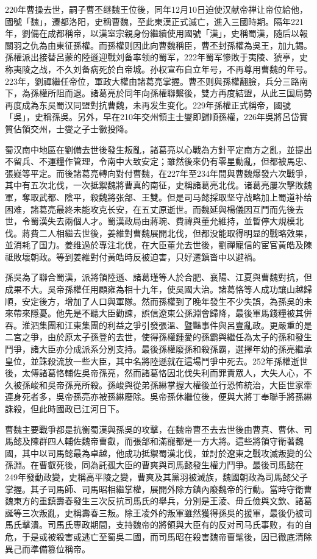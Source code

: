 220年曹操去世，嗣子曹丕继魏王位後，同年12月10日迫使汉献帝禅让帝位給他，國號「魏」，遷都洛阳，史稱曹魏，至此東漢正式滅亡，進入三國時期。隔年221年，劉備在成都稱帝，以漢室宗親身份繼續使用國號「漢」，史稱蜀漢，随后以報關羽之仇為由東征孫權。而孫權则因此向曹魏稱臣，曹丕封孫權為吳王，加九錫。孫權派出接替呂蒙的陸遜迎戰刘备率领的蜀军，222年蜀军慘敗于夷陵、猇亭，史称夷陵之战，不久刘备病死於白帝城。孙权宣布自立年号，不再尊用曹魏的年号。223年，劉禪繼任帝位，軍政大權由諸葛亮掌握。曹丕则與孫權翻臉，兵分三路南下，為孫權所阻而退。諸葛亮於同年向孫權聯繫後，雙方再度結盟，从此三国局勢再度成為东吳蜀汉同盟對抗曹魏，未再发生变化。229年孫權正式稱帝，國號「吳」，史稱孫吳。另外，早在210年交州領主士燮即歸順孫權，226年吳將呂岱實質佔領交州，士燮之子士徽投降。

蜀汉南中地區在劉備去世後發生叛亂，諸葛亮以心戰為方針平定南方之亂，並提出不留兵、不運糧作管理，令南中大致安定；雖然後來仍有零星動亂，但都被馬忠、張嶷等平定。而後諸葛亮轉向對付曹魏，在227年至234年間與曹魏爆發六次戰爭，其中有五次北伐，一次抵禦魏將曹真的南征，史稱諸葛亮北伐。诸葛亮屢次擊敗魏軍，奪取武都、陰平，殺魏將张郃、王雙。但是司马懿採取坚守战略加上蜀道补给困难，諸葛亮最終未能攻克长安，在五丈原逝世。而魏延與楊儀因互鬥而先後去世，令蜀漢失去兩個人才。蜀漢政局由蔣琬、費禕與董允維持，並暫停大規模北伐。蔣費二人相繼去世後，姜維對曹魏展開北伐，但都没能取得明显的戰略效果，並消耗了国力。姜维過於專注北伐，在大臣董允去世後，劉禪寵信的宦官黃皓及陳祗敗壞朝政。等到姜維對付黃皓時反被迫害，只好遷鎮沓中以避禍。

孫吳為了聯合蜀漢，派將領陸遜、諸葛瑾等人於合肥、襄陽、江夏與曹魏對抗，但成果不大。吳帝孫權任用顧雍為相十九年，使吳國大治。諸葛恪等人成功讓山越歸順，安定後方，增加了人口與軍隊。然而孫權到了晚年發生不少失誤，為孫吳的未來帶來隱憂。他先是不聽大臣勸諫，誤信遼東公孫淵會歸降，最後軍馬錢糧被其併吞。淮泗集團和江東集團的利益之爭引發張溫、暨豔事件與呂壹亂政。更嚴重的是二宮之爭，由於原太子孫登的去世，使得孫權鍾愛的孫霸與繼任為太子的孫和發生鬥爭，諸大臣亦分成派系分別支持。最後孫權廢孫和殺孫霸，選擇年幼的孫亮繼承皇位，並誅殺流放一些大臣，其中名將陸遜就在這場鬥爭中死去。252年孫權逝世後，太傅諸葛恪輔佐吳帝孫亮，然而諸葛恪因北伐失利而罪責眾人，大失人心，不久被孫峻和吳帝孫亮所殺。孫峻與從弟孫綝掌握大權後並行恐怖統治，大臣世家牽連身死者多，吳帝孫亮亦被孫綝廢除。吳帝孫休繼位後，便與大將丁奉聯手將孫綝誅殺，但此時國政已江河日下。

曹魏主要戰爭都是抗衡蜀漢與孫吳的攻擊，在魏帝曹丕去去世後由曹真、曹休、司馬懿及陳群四人輔佐魏帝曹叡，而張郃和滿寵都是一方大將。這些將領守衛著魏國，其中以司馬懿最為卓越，他成功抵禦蜀漢北伐，並討於遼東之戰攻滅叛變的公孫淵。在曹叡死後，同為託孤大臣的曹爽與司馬懿發生權力鬥爭。最後司馬懿在249年發動政變，史稱高平陵之變，曹爽及其黨羽被滅族，魏國朝政為司馬懿父子掌握。其子司馬師、司馬昭相繼掌權，展開外除方鎮內廢魏帝的行動。當時守衛曹魏東方的重鎮壽春發生三次反抗司馬氏的舉兵，分別是王淩、毌丘儉與文欽、諸葛誕等三次叛亂，史稱壽春三叛。除王凌外的叛軍雖然獲得孫吳的援軍，最後仍被司馬氏擊潰。司馬氏專政期間，支持魏帝的將領與大臣有的反对司马氏事败，有的自危，于是或被殺害或逃亡至蜀吳二國，而司馬昭在殺害魏帝曹髦後，因已徹底清除異己而準備篡位稱帝。

